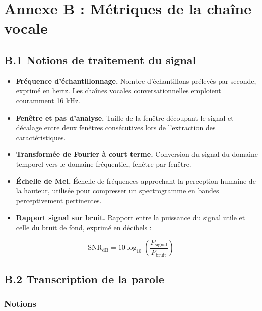 \newpage

\chapter*{Annexe B : Métriques de la chaîne vocale}

\section*{B.1 Notions de traitement du signal}

\begin{itemize}
  \item \textbf{Fréquence d'échantillonnage.} Nombre d'échantillons prélevés par seconde, exprimé en hertz. Les chaînes vocales conversationnelles emploient couramment 16 kHz.
  \item \textbf{Fenêtre et pas d'analyse.} Taille de la fenêtre découpant le signal et décalage entre deux fenêtres consécutives lors de l'extraction des caractéristiques.
  \item \textbf{Transformée de Fourier à court terme.} Conversion du signal du domaine temporel vers le domaine fréquentiel, fenêtre par fenêtre.
  \item \textbf{Échelle de Mel.} Échelle de fréquences approchant la perception humaine de la hauteur, utilisée pour compresser un spectrogramme en bandes perceptivement pertinentes.
  \item \textbf{Rapport signal sur bruit.} Rapport entre la puissance du signal utile et celle du bruit de fond, exprimé en décibels :
\end{itemize}

\begin{equation}
\mathrm{SNR}_{\mathrm{dB}} = 10 \log_{10}\left(\frac{P_{\mathrm{signal}}}{P_{\mathrm{bruit}}}\right)
\end{equation}

\section*{B.2 Transcription de la parole}

\subsection*{Notions}

